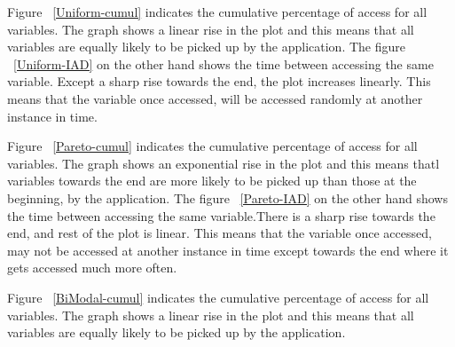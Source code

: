 Figure ~\ref{Uniform-cumul} indicates the cumulative percentage of access for all variables. The graph shows a linear rise in the plot and this means that all variables are equally likely to be picked up by the application. The figure ~\ref{Uniform-IAD} on the other hand shows the time between accessing the same variable. Except a sharp rise towards the end, the plot increases linearly. This means that the variable once accessed, will be accessed randomly at another instance in time. 

Figure ~\ref{Pareto-cumul} indicates the cumulative percentage of access for all variables. The graph shows an exponential rise in the plot and this means thatl variables towards the end are more likely to be picked up than those at the beginning, by the application. The figure ~\ref{Pareto-IAD} on the other hand shows the time between accessing the same variable.There is a sharp rise towards the end, and rest of the plot is linear. This means that the variable once accessed, may not be accessed at another instance in time except towards the end where it gets accessed much more often.

Figure ~\ref{BiModal-cumul} indicates the cumulative percentage of access for all variables. The graph shows a linear rise in the plot and this means that all variables are equally likely to be picked up by the application.



